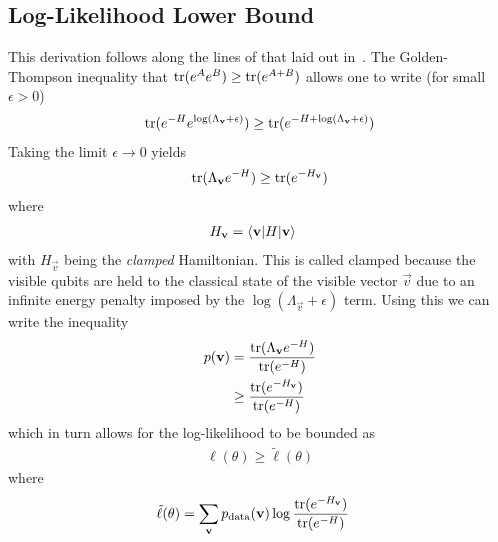 \subsection{Log-Likelihood Lower Bound}\label{app:qbm_log_likelihood_lower_bound}
This derivation follows along the lines of that laid out in~\cite{amin_2018}.
The Golden-Thompson inequality that \( \text{tr}(e^{A}e^{B}) \ge \text{tr}(e^{A+B}) \) allows one to write (for small \( \epsilon > 0 \))
\begin{align}
    \text{tr}(e^{-H} e^{\log(\Lambda_{\mathbf{v}}+\epsilon)}) \ge \text{tr}(e^{-H+\log(\Lambda_{\mathbf{v}}+\epsilon)})
\end{align}
Taking the limit \( \epsilon \rightarrow 0 \) yields
\begin{align}
    \text{tr}(\Lambda_{\mathbf{v}}e^{-H}) \ge \text{tr}(e^{-H_{\mathbf{v}}})
\end{align}
where
\begin{align}
    H_{\mathbf{v}} &= \braket{\mathbf{v} | H | \mathbf{v}}
\end{align}
with \( H_\vec{v} \) being the \textit{clamped} Hamiltonian.
This is called clamped because the visible qubits are held to the classical state of the visible vector \( \vec{v} \) due to an infinite energy penalty imposed by the \( \log(\Lambda_\vec{v} + \epsilon) \) term.
Using this we can write the inequality
\begin{align}
\begin{split}
    p(\mathbf{v})
        &= \frac{\text{tr}(\Lambda_{\mathbf{v}} e^{-H})}{\text{tr}(e^{-H})} \\
        &\ge \frac{\text{tr}(e^{-H_{\mathbf{v}}})}{\text{tr}(e^{-H})}
\end{split}
\end{align}
which in turn allows for the log-likelihood to be bounded as
\begin{align}
    \ell(\theta) \ge \tilde{\ell}(\theta)
\end{align}
where
\begin{align}
    \tilde{\ell}(\theta)
        &= \sum_{\mathbf{v}} p_\text{data}(\mathbf{v}) \log\frac{\text{tr}(e^{-H_{\mathbf{v}}})}{\text{tr}(e^{-H})}
\end{align}
